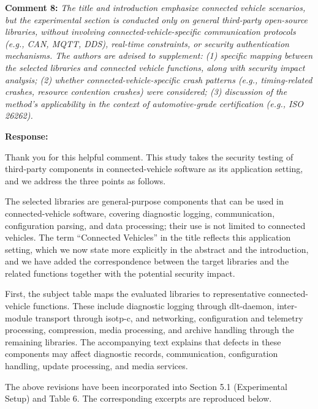 \documentclass[onecolumn,11pt]{article}
\newcommand{\secc}[2]{\par\mySep \noindent \textsf{\textbf{#1 }}\textit{#2}\par}
\newcommand{\secr}[2]{\par\mySep \noindent \textsf{\textbf{#1 }}{#2}\par}
\newcommand{\mySep}{\vspace{8pt}}
\begin{document}
\secc{Comment 8:}{The title and introduction emphasize connected vehicle scenarios, but the experimental section is conducted only on general third-party open-source libraries, without involving connected-vehicle-specific communication protocols (e.g., CAN, MQTT, DDS), real-time constraints, or security authentication mechanisms. The authors are advised to supplement: (1) specific mapping between the selected libraries and connected vehicle functions, along with security impact analysis; (2) whether connected-vehicle-specific crash patterns (e.g., timing-related crashes, resource contention crashes) were considered; (3) discussion of the method's applicability in the context of automotive-grade certification (e.g., ISO 26262).}
\secr{Response:}{Thank you for this helpful comment. This study takes the security testing of third-party components in connected-vehicle software as its application setting, and we address the three points as follows.

The selected libraries are general-purpose components that can be used in connected-vehicle software, covering diagnostic logging, communication, configuration parsing, and data processing; their use is not limited to connected vehicles. The term ``Connected Vehicles'' in the title reflects this application setting, which we now state more explicitly in the abstract and the introduction, and we have added the correspondence between the target libraries and the related functions together with the potential security impact.

First, the subject table maps the evaluated libraries to representative connected-vehicle functions. These include diagnostic logging through dlt-daemon, inter-module transport through isotp-c, and networking, configuration and telemetry processing, compression, media processing, and archive handling through the remaining libraries. The accompanying text explains that defects in these components may affect diagnostic records, communication, configuration handling, update processing, and media services.

The above revisions have been incorporated into Section 5.1 (Experimental Setup) and Table 6. The corresponding excerpts are reproduced below.}
\end{document}
